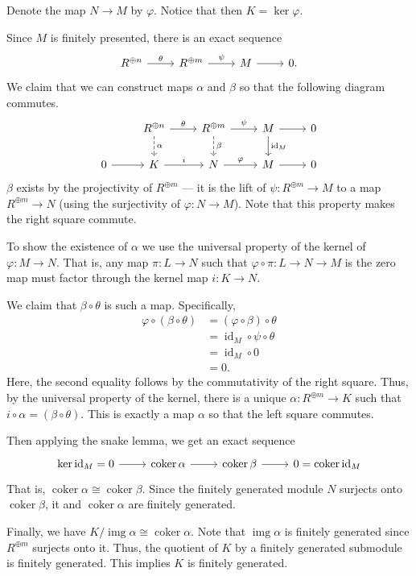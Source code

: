 \documentclass[12 pt, letterpaper]{hmcpset}
\begin{document}
\begin{solution}
	Denote the map $N \to M$ by $\varphi$. Notice that then $K = \ker \varphi$.

	Since $M$ is finitely presented, there is an exact sequence
	\[
		\begin{tikzcd}
			R^{\oplus n} \ar[r, "\theta"] & R^{\oplus m} \ar[r, "\psi"] & M \ar[r] & 0.
		\end{tikzcd}
	\]
	We claim that we can construct maps $\alpha$ and $\beta$ so that the following diagram commutes.
	\[
		\begin{tikzcd}
			& R^{\oplus n} \ar[r, "\theta"] \ar[d, dashed, "\alpha"] & R^{\oplus m} \ar[r, "\psi"] \ar[d, dashed, "\beta"] & M \ar[r] \ar[d, "\operatorname{id}_{M}"] & 0 \\
			0 \ar[r] & K \ar[r, "i"] & N \ar[r, "\varphi"] & M \ar[r] & 0
		\end{tikzcd}
	\]
	$\beta$ exists by the projectivity of $R^{\oplus m}$ --- it is the lift of $\psi : R^{\oplus m} \to M$ to a map $R^{\oplus m} \to N$ (using the surjectivity of $\varphi : N \to M$). Note that this property makes the right square commute.

	To show the existence of $\alpha$ we use the universal property of the kernel of $\varphi : M \to N$. That is, any map $\pi : L \to N$ such that $\varphi \circ \pi : L \to N \to M$ is the zero map must factor through the kernel map $i : K \to N$.

	We claim that $\beta \circ \theta$ is such a map. Specifically,
	\begin{align*}
		\varphi \circ (\beta \circ \theta) & = (\varphi \circ \beta) \circ \theta \\
						   & = \operatorname{id}_{M} \circ \psi \circ \theta \\
						   & = \operatorname{id}_{M} \circ 0 \\
						   & = 0.
	\end{align*}
	Here, the second equality follows by the commutativity of the right square. Thus, by the universal property of the kernel, there is a unique $\alpha : R^{\oplus m} \to K$ such that $i \circ \alpha = (\beta \circ \theta)$. This is exactly a map $\alpha$ so that the left square commutes.

	Then applying the snake lemma, we get an exact sequence
	\[
		\begin{tikzcd}
			\ker \operatorname{id}_{M} = 0 \ar[r] & \operatorname{coker} \alpha \ar[r] & \operatorname{coker} \beta \ar[r] & 0 = \operatorname{coker} \operatorname{id}_{M}
		\end{tikzcd}
	\]
	That is, $\operatorname{coker} \alpha \cong \operatorname{coker} \beta$. Since the finitely generated module $N$ surjects onto $\operatorname{coker} \beta$, it and $\operatorname{coker} \alpha$ are finitely generated.

	Finally, we have $K / \operatorname{img} \alpha \cong \operatorname{coker} \alpha$. Note that $\operatorname{img} \alpha$ is finitely generated since $R^{\oplus m}$ surjects onto it. Thus, the quotient of $K$ by a finitely generated submodule is finitely generated. This implies $K$ is finitely generated.
\end{solution}
\end{document}
